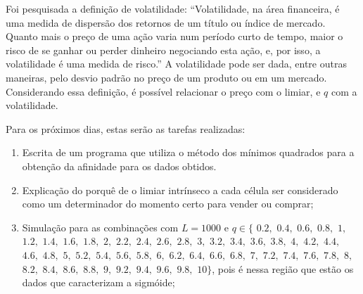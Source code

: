 \documentclass[12pt,a4paper,final]{article}
\begin{document}
  Foi pesquisada a definição de volatilidade: ``Volatilidade, na área financeira, é uma medida de dispersão dos retornos de um título ou índice de mercado. Quanto mais o preço de uma ação varia num período curto de tempo, maior o risco de se ganhar ou perder dinheiro negociando esta ação, e, por isso, a volatilidade é uma medida de risco.'' A volatilidade pode ser dada, entre outras maneiras, pelo desvio padrão no preço de um produto ou em um mercado. Considerando essa definição, é possível relacionar o preço com o limiar, e $q$ com a volatilidade.

  Para os próximos dias, estas serão as tarefas realizadas:
  \begin{enumerate}
    \item Escrita de um programa que utiliza o método dos mínimos quadrados para a obtenção da afinidade para os dados obtidos.
    \item Explicação do porquê de o limiar intrínseco a cada célula ser considerado como um determinador do momento certo para vender ou comprar;
    \item Simulação para as combinações com $L = 1000$ e $q\in\{$ 
    $0.2,$ $0.4,$ $0.6,$ $0.8,$ $1,$ 
    $1.2,$ $1.4,$ $1.6,$ $1.8,$ $2,$ 
    $2.2,$ $2.4,$ $2.6,$ $2.8,$ $3,$
    $3.2,$ $3.4,$ $3.6,$ $3.8,$ $4,$
    $4.2,$ $4.4,$ $4.6,$ $4.8,$ $5,$
    $5.2,$ $5.4,$ $5.6,$ $5.8,$ $6,$
    $6.2,$ $6.4,$ $6.6,$ $6.8,$ $7,$ 
    $7.2,$ $7.4,$ $7.6,$ $7.8,$ $8,$
    $8.2,$ $8.4,$ $8.6,$ $8.8,$ $9,$ 
    $9.2,$ $9.4,$ $9.6,$ $9.8,$ $10\}$, pois é nessa região que estão os dados que caracterizam a sigmóide;
	\end{enumerate}
\end{document}
